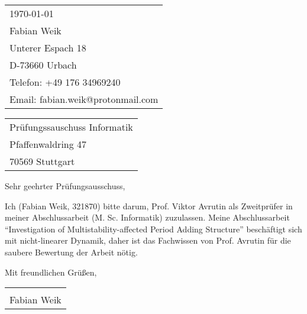 \documentclass{article}
\begin{document}
    \hfill
    \begin{tabular}{l @{}}
        \today \bigskip\\
        Fabian Weik \\
        Unterer Espach 18 \\
        D-73660 Urbach \\
        Telefon: +49 176 34969240 \\
        Email: fabian.weik@protonmail.com
    \end{tabular}

    \bigskip

    \begin{tabular}{@{} l}
        Prüfungssauschuss Informatik \\
        Pfaffenwaldring 47 \\
        70569 Stuttgart
    \end{tabular}

    \bigskip

    Sehr geehrter Prüfungsausschuss,

    \bigskip

    Ich (Fabian Weik, 321870) bitte darum, Prof. Viktor Avrutin als Zweitprüfer in meiner Abschlussarbeit (M. Sc. Informatik) zuzulassen.
    Meine Abschlussarbeit ``Investigation of Multistability-affected Period Adding Structure'' beschäftigt sich mit nicht-linearer Dynamik, daher ist das Fachwissen von Prof. Avrutin für die saubere Bewertung der Arbeit nötig.

    \bigskip

    Mit freundlichen Grüßen,
    
    \bigskip

    \vspace{1cm}
    \begin{tabular}{@{}p{2.5in}@{}}
    \hrulefill \\
    Fabian Weik
    \end{tabular}
    
\end{document}
